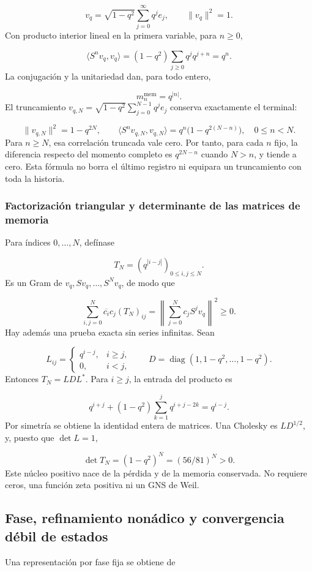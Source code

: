 \[
v_q=\sqrt{1-q^2}\sum_{j=0}^{\infty}q^j e_j,
\qquad \|v_q\|^2=1.
\]
Con producto interior lineal en la primera variable, para \(n\ge0\),

\[
\langle S^n v_q,v_q\rangle
=(1-q^2)\sum_{j\ge0}q^j q^{j+n}=q^n.
\]
La conjugación y la unitariedad dan, para todo entero,

\[
\boxed{m_n^{\mathrm{mem}}=q^{|n|}.}
\]
El truncamiento \(v_{q,N}=\sqrt{1-q^2}\sum_{j=0}^{N-1}q^j e_j\) conserva exactamente el terminal:

\[
\|v_{q,N}\|^2=1-q^{2N},\qquad
\langle S^n v_{q,N},v_{q,N}\rangle
=q^n\bigl(1-q^{2(N-n)}\bigr),\quad 0\le n<N.
\]
Para \(n\ge N\), esa correlación truncada vale cero. Por tanto, para cada \(n\) fijo, la diferencia respecto del momento completo es \(q^{2N-n}\) cuando \(N>n\), y tiende a cero. Esta fórmula no borra el último registro ni equipara un truncamiento con toda la historia.


\subsubsection{Factorización triangular y determinante de las matrices de memoria}
\label{viii:tm-add-m2-2}
Para índices \(0,\ldots,N\), defínase

\[
T_N=(q^{|i-j|})_{0\le i,j\le N}.
\]
Es un Gram de \(v_q,Sv_q,\ldots,S^Nv_q\), de modo que

\[
\sum_{i,j=0}^{N}\overline{c_i}c_j(T_N)_{ij}
=\left\|\sum_{j=0}^{N}c_jS^jv_q\right\|^2\ge0.
\]
Hay además una prueba exacta sin series infinitas. Sean

\[
L_{ij}=\begin{cases}q^{i-j},&i\ge j,\\0,&i<j,\end{cases}
\qquad D=\operatorname{diag}(1,1-q^2,\ldots,1-q^2).
\]
Entonces \(T_N=LDL^*\). Para \(i\ge j\), la entrada del producto es

\[
q^{i+j}+(1-q^2)\sum_{k=1}^{j}q^{i+j-2k}
=q^{i-j}.
\]
Por simetría se obtiene la identidad entera de matrices. Una Cholesky es \(L D^{1/2}\), y, puesto que \(\det L=1\),

\[
\boxed{\det T_N=(1-q^2)^N=(56/81)^N>0.}
\]
Este núcleo positivo nace de la pérdida y de la memoria conservada. No requiere ceros, una función zeta positiva ni un GNS de Weil.


\subsection{Fase, refinamiento nonádico y convergencia débil de estados}
\label{viii:tm-add-m3}
Una representación por fase fija se obtiene de

